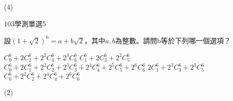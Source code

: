 \begin{QUESTIONS}
\begin{QUESTION}
\begin{QBODY}
			\begin{QOPS}
			\end{QOPS}
        \end{QBODY}
        \begin{QFROMS}
        \end{QFROMS}
        \begin{QTAGS}\end{QTAGS}
        \begin{QANS}
            (4)
        \end{QANS}
        \begin{QSOLLIST}
        \end{QSOLLIST}
        \begin{QEMPTYSPACE}
        \end{QEMPTYSPACE}
    \end{QUESTION}
    \begin{QUESTION}
        \begin{ExamInfo}{103}{學測}{單選}{5}
        \end{ExamInfo}
        \begin{ExamAnsRateInfo}{69}{97}{77}{33}
        \end{ExamAnsRateInfo}
        \begin{QBODY}
			設${{(1+\sqrt{2})}^{6}}=a+b\sqrt{2}$，其中$a,b$為整數。請問b等於下列哪一個選項？
			\begin{QOPS}
				\QOP $C_{0}^{6}+2C_{2}^{6}+{{2}^{2}}C_{4}^{6}+{{2}^{3}}C_{6}^{6}$
				\QOP $C_{1}^{6}+2C_{3}^{6}+{{2}^{2}}C_{5}^{6}$
				\QOP $C_{0}^{6}+2C_{1}^{6}+{{2}^{2}}C_{2}^{6}+{{2}^{3}}C_{3}^{6}+{{2}^{4}}C_{4}^{6}+{{2}^{5}}C_{5}^{6}+{{2}^{6}}C_{6}^{6}$
				\QOP $2C_{1}^{6}+{{2}^{2}}C_{3}^{6}+{{2}^{3}}C_{5}^{6}$
				\QOP $C_{0}^{6}+{{2}^{2}}C_{2}^{6}+{{2}^{4}}C_{4}^{6}+{{2}^{6}}C_{6}^{6}$
			\end{QOPS}
        \end{QBODY}
        \begin{QFROMS}
        \end{QFROMS}
        \begin{QTAGS}\end{QTAGS}
        \begin{QANS}
            (2)
        \end{QANS}
        \begin{QSOLLIST}
        \end{QSOLLIST}
        \begin{QEMPTYSPACE}
        \end{QEMPTYSPACE}

\end{QUESTION}
\end{QUESTIONS}
